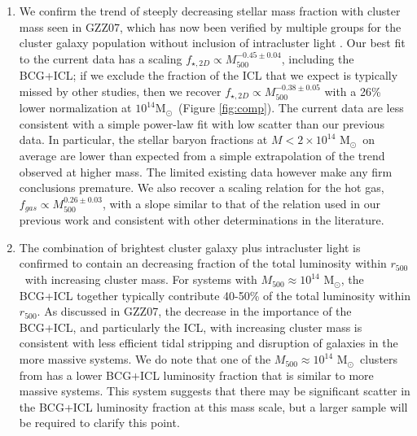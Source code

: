 \documentclass[preprint]{emulateapj}
\newcommand{\msun}{M$_\odot$}
\newcommand\rfive{$r_{500}$}
\newcommand\ptwo{GZZ07}
\newcommand\mfive{${M}_{500}$}
\begin{document}
\begin{enumerate}

\item{We confirm the trend of steeply decreasing stellar mass fraction
    with cluster mass seen in \ptwo, which has now been verified by multiple groups
    for the cluster galaxy population without inclusion of
    intracluster light \citep[$-0.3\ga \alpha \ga-0.55$, Table
    \ref{tab:slopes};][]{giodini2009,andreon2010,zhang2011,lin2012}.
    Our best fit to the current data has a scaling
    $f_{\star,2D}\propto M_{500}^{-0.45\pm0.04}$, including the BCG+ICL;
    if we exclude the fraction of the ICL that we expect is typically
    missed by other studies, then we recover $f_{\star,2D}\propto
    M_{500}^{-0.38\pm0.05}$ with a 26\% lower normalization at
    $10^{14}$\msun\ (Figure \ref{fig:comp}).  The current data are
    less consistent with a simple power-law fit with low scatter than
    our previous data. In particular, the stellar baryon fractions at
    $M<2\times10^{14}$ \msun\ on average are lower than expected from
    a simple extrapolation of the trend observed at higher mass. The
    limited existing data however make any firm conclusions premature. 
    We also recover a scaling relation for the hot gas, $f_{gas}\propto M_{500}^{0.26\pm0.03}$,
    with a slope similar to that of the relation used in our previous work and consistent
    with other determinations in the literature.}

\item{The combination of brightest cluster galaxy plus intracluster
    light is confirmed to contain an decreasing fraction of the total
    luminosity within \rfive\ with increasing cluster mass. For
    systems with \mfive$\approx10^{14}$ \msun, the BCG+ICL together
    typically contribute 40-50\% of the total luminosity within
    \rfive. As discussed in \ptwo, the decrease in the importance of
    the BCG+ICL, and particularly the ICL, with increasing cluster
    mass is consistent with less efficient tidal stripping and
    disruption of galaxies in the more massive systems. We do note
    that one of the \mfive$\approx10^{14}$ \msun\ clusters from
    \citet{sanderson2013} has a lower BCG+ICL luminosity fraction that
    is similar to more massive systems. This system suggests that
    there may be significant scatter in the BCG+ICL luminosity
    fraction at this mass scale, but a larger sample will be required
    to clarify this point.}


\end{enumerate}
\end{document}
